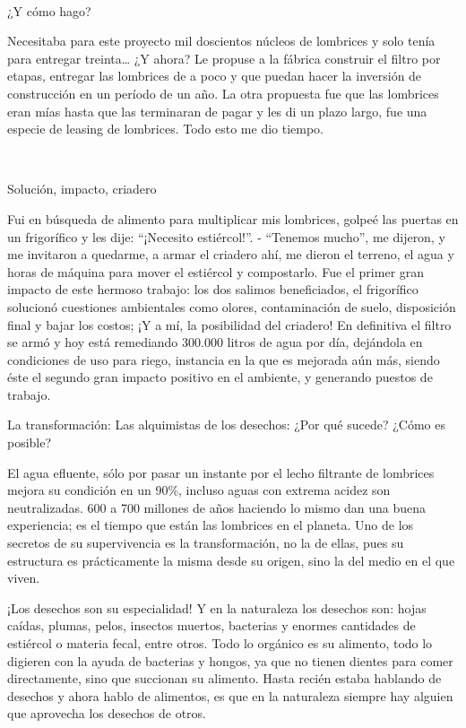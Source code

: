 \begin{fullwidth}
~

¿Y cómo hago?

Necesitaba para este proyecto mil doscientos núcleos de lombrices y solo
tenía para entregar treinta\ldots{} ¿Y ahora? Le propuse a la fábrica
construir el filtro por etapas, entregar las lombrices de a poco y que
puedan hacer la inversión de construcción en un período de un año. La
otra propuesta fue que las lombrices eran mías hasta que las terminaran
de pagar y les di un plazo largo, fue una especie de leasing de
lombrices. Todo esto me dio tiempo.

~

Solución, impacto, criadero

Fui en búsqueda de alimento para multiplicar mis lombrices, golpeé las
puertas en un frigorífico y les dije: ``¡Necesito estiércol!''. -
``Tenemos mucho'', me dijeron, y me invitaron a quedarme, a armar el
criadero ahí, me dieron el terreno, el agua y horas de máquina para
mover el estiércol y compostarlo. Fue el primer gran impacto de este
hermoso trabajo: los dos salimos beneficiados, el frigorífico solucionó
cuestiones ambientales como olores, contaminación de suelo, disposición
final y bajar los costos; ¡Y a mí, la posibilidad del criadero! En
definitiva el filtro se armó y hoy está remediando 300.000 litros de
agua por día, dejándola en condiciones de uso para riego, instancia en
la que es mejorada aún más, siendo éste el segundo gran impacto positivo
en el ambiente, y generando puestos de trabajo.

La transformación: Las alquimistas de los desechos: ¿Por qué sucede?
¿Cómo es posible?

El agua efluente, sólo por pasar un instante por el lecho filtrante de
lombrices mejora su condición en un 90\%, incluso aguas con extrema
acidez son neutralizadas. 600 a 700 millones de años haciendo lo mismo
dan una buena experiencia; es el tiempo que están las lombrices en el
planeta. Uno de los secretos de su supervivencia es la transformación,
no la de ellas, pues su estructura es prácticamente la misma desde su
origen, sino la del medio en el que viven.

¡Los desechos son su especialidad! Y en la naturaleza los desechos son:
hojas caídas, plumas, pelos, insectos muertos, bacterias y enormes
cantidades de estiércol o materia fecal, entre otros. Todo lo orgánico
es su alimento, todo lo digieren con la ayuda de bacterias y hongos, ya
que no tienen dientes para comer directamente, sino que succionan su
alimento. Hasta recién estaba hablando de desechos y ahora hablo de
alimentos, es que en la naturaleza siempre hay alguien que aprovecha los
desechos de otros.


\end{fullwidth}
